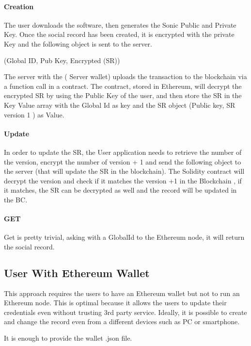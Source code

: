 \paragraph{Creation}

The user downloads the software, then generates the Sonic Public and Private Key. Once the social record has been created, it is encrypted with the private Key and the following object is sent to the server.

(Global ID, Pub Key, Encrypted (SR))

The server with the ( Server wallet) uploads the transaction to the blockchain via a function call in a contract. The contract, stored in Ethereum, will decrypt the encrypted SR by using the Public Key of the user,  and then store the SR in the Key Value array with the Global Id as key and the SR object (Public key, SR version 1 ) as Value.

\paragraph{Update}

In order to update the SR, the User application needs to retrieve the number of the version, encrypt the number of version + 1 and send the following object to the server (that will update the SR in the blockchain). The Solidity contract will decrypt the version and check if it matches the version +1 in the Blockchain , if it matches, the SR can be decrypted as well and the record will be updated in the BC.

\paragraph{GET}

Get is pretty trivial, asking with a GlobalId to the Ethereum node, it will return the social record.

\subsection{User With Ethereum Wallet}

This approach requires the users to have an Ethereum wallet but not to run an Ethereum node.
This is optimal because it allows the users to update their credentials even without trusting 3rd party service. Ideally, it is possible to create and change the record even from a different devices such as PC or smartphone.

It is enough to provide the wallet .json file.

